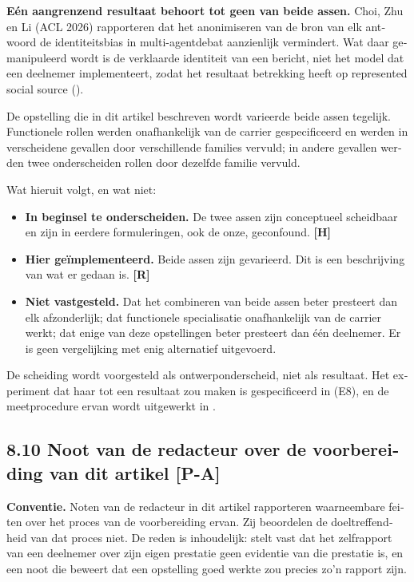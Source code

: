 \begin{dutch}
\textbf{Eén aangrenzend resultaat behoort tot geen van beide assen.} \gcheck{} Choi, Zhu en Li (ACL 2026) rapporteren dat het anonimiseren van de bron van elk antwoord de identiteitsbias in multi-agentdebat aanzienlijk vermindert. Wat daar gemanipuleerd wordt is de verklaarde identiteit van een bericht, niet het model dat een deelnemer implementeert, zodat het resultaat betrekking heeft op represented social source ().

De opstelling die in dit artikel beschreven wordt varieerde beide assen tegelijk. Functionele rollen werden onafhankelijk van de carrier gespecificeerd en werden in verscheidene gevallen door verschillende families vervuld; in andere gevallen werden twee onderscheiden rollen door dezelfde familie vervuld.

Wat hieruit volgt, en wat niet:

\begin{itemize}
  \item \textbf{In beginsel te onderscheiden.} De twee assen zijn conceptueel scheidbaar en zijn in eerdere formuleringen, ook de onze, geconfound. \textbf{[H]}
  \item \textbf{Hier geïmplementeerd.} Beide assen zijn gevarieerd. Dit is een beschrijving van wat er gedaan is. \textbf{[R]}
  \item \textbf{Niet vastgesteld.} Dat het combineren van beide assen beter presteert dan elk afzonderlijk; dat functionele specialisatie onafhankelijk van de carrier werkt; dat enige van deze opstellingen beter presteert dan één deelnemer. Er is geen vergelijking met enig alternatief uitgevoerd.
\end{itemize}
De scheiding wordt voorgesteld als ontwerponderscheid, niet als resultaat. Het experiment dat haar tot een resultaat zou maken is gespecificeerd in  (E8), en de meetprocedure ervan wordt uitgewerkt in .


\subsection*{8.10 Noot van de redacteur over de voorbereiding van dit artikel \textbf{[P-A]}}
\label{sec:nl:8.10}

\textbf{Conventie.} Noten van de redacteur in dit artikel rapporteren waarneembare feiten over het proces van de voorbereiding ervan. Zij beoordelen de doeltreffendheid van dat proces niet. De reden is inhoudelijk:  stelt vast dat het zelfrapport van een deelnemer over zijn eigen prestatie geen evidentie van die prestatie is, en een noot die beweert dat een opstelling goed werkte zou precies zo'n rapport zijn.


\end{dutch}
